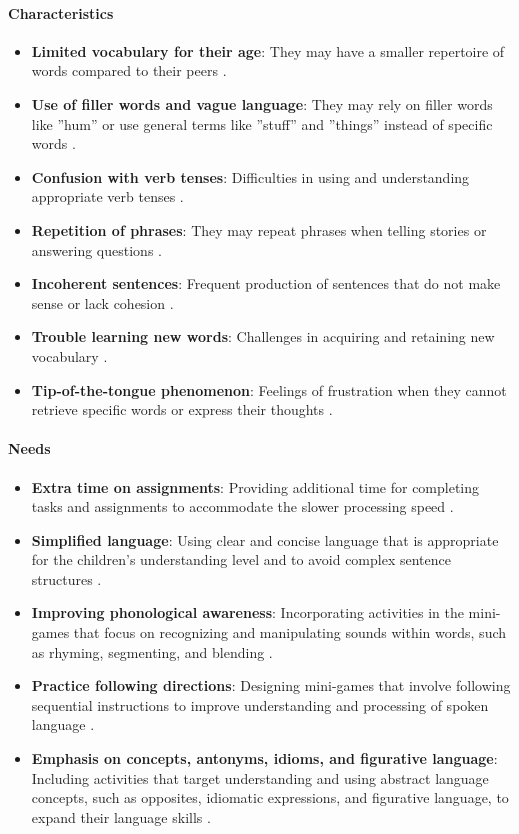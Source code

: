 \paragraph{Characteristics}
\begin{itemize}
    \item \textbf{Limited vocabulary for their age}: They may have a smaller repertoire of words compared to their peers \cite{additude}.
    \item \textbf{Use of filler words and vague language}: They may rely on filler words like ''hum'' or use general terms like ''stuff'' and ''things'' instead of specific words \cite{additude}.
    \item \textbf{Confusion with verb tenses}: Difficulties in using and understanding appropriate verb tenses \cite{greatspeech}.
    \item \textbf{Repetition of phrases}: They may repeat phrases when telling stories or answering questions \cite{additude}.
    \item \textbf{Incoherent sentences}: Frequent production of sentences that do not make sense or lack cohesion \cite{additude}.
    \item \textbf{Trouble learning new words}: Challenges in acquiring and retaining new vocabulary \cite{additude}.
    \item \textbf{Tip-of-the-tongue phenomenon}: Feelings of frustration when they cannot retrieve specific words or express their thoughts \cite{additude}.
\end{itemize}

\paragraph{Needs}
\begin{itemize}
    \item \textbf{Extra time on assignments}: Providing additional time for completing tasks and assignments to accommodate the slower processing speed \cite{vanderbilt}.
    \item \textbf{Simplified language}: Using clear and concise language that is appropriate for the children's understanding level and to avoid complex sentence structures \cite{additude}.
    \item \textbf{Improving phonological awareness}: Incorporating activities in the mini-games that focus on recognizing and manipulating sounds within words, such as rhyming, segmenting, and blending \cite{vanderbilt}.
    \item \textbf{Practice following directions}: Designing mini-games that involve following sequential instructions to improve understanding and processing of spoken language \cite{vanderbilt}.
    \item \textbf{Emphasis on concepts, antonyms, idioms, and figurative language}: Including activities that target understanding and using abstract language concepts, such as opposites, idiomatic expressions, and figurative language, to expand their language skills \cite{vanderbilt}.
\end{itemize}

